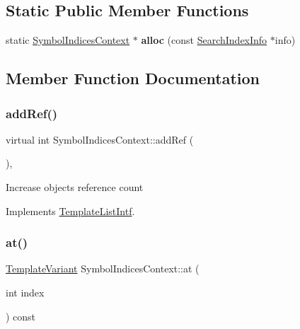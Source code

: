 \subsection*{Static Public Member Functions}
\begin{DoxyCompactItemize}
\item 
\mbox{\label{class_symbol_indices_context_afdbe92dd6decc04fb41ca1298515d0b5}} 
static \mbox{\hyperlink{class_symbol_indices_context}{Symbol\+Indices\+Context}} $\ast$ {\bfseries alloc} (const \mbox{\hyperlink{struct_search_index_info}{Search\+Index\+Info}} $\ast$info)
\end{DoxyCompactItemize}


\subsection{Member Function Documentation}
\mbox{\label{class_symbol_indices_context_aa4cc95c4e452e146f0b0e72142f5f1bf}} 
\subsubsection{\texorpdfstring{addRef()}{addRef()}}
{\footnotesize\ttfamily virtual int Symbol\+Indices\+Context\+::add\+Ref (\begin{DoxyParamCaption}{ }\end{DoxyParamCaption})\hspace{0.3cm}{\ttfamily [inline]}, {\ttfamily [virtual]}}

Increase object\textquotesingle{}s reference count 

Implements \mbox{\hyperlink{class_template_list_intf_a4b4973e2e15396d10bc4e3085462ca2b}{Template\+List\+Intf}}.

\mbox{\label{class_symbol_indices_context_a246d9d512a0daa50f0cdd0c2abfb86af}} 
\subsubsection{\texorpdfstring{at()}{at()}}
{\footnotesize\ttfamily \mbox{\hyperlink{class_template_variant}{Template\+Variant}} Symbol\+Indices\+Context\+::at (\begin{DoxyParamCaption}\item[{int}]{index }\end{DoxyParamCaption}) const\hspace{0.3cm}{\ttfamily [virtual]}}

